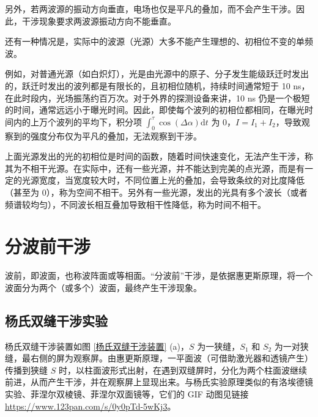 \documentclass[UTF8]{report}
\theoremstyle{MyLineTheoremStyle} %
\theoremstyle{MyBlockTheoremStyle} %
\theoremstyle{MySubsubsectionStyle} %
\begin{document}
另外，若两波源的振动方向垂直，电场也仅是平凡的叠加，而不会产生干涉。因此，干涉现象要求两波源振动方向不能垂直。

还有一种情况是，实际中的波源（光源）大多不能产生理想的、初相位不变的单频波。

例如，对普通光源（如白炽灯），光是由光源中的原子、分子发生能级跃迁时发出的，跃迁时发出的波列都是有限长的，且初相位随机，持续时间通常短于 10 ns，在此时段内，光场振荡约百万次。对于外界的探测设备来讲，10 ns 仍是一个极短的时间，通常远远小于曝光时间。因此，即使每个波列的初相位都相同，在曝光时间内的上万个波列的平均下，积分项 $\int_{0}^{\tau}  \cos(\Delta \alpha) \mathrm{d} t$ 为 0，$I = I_1 + I_2$，导致观察到的强度分布仅为平凡的叠加，无法观察到干涉。

上面光源发出的光的初相位是时间的函数，随着时间快速变化，无法产生干涉，称其为不相干光源。在实际中，还有一些光源，并不能达到完美的点光源，而是有一定的光源宽度，当宽度较大时，不同位置上光的叠加，会导致条纹的对比度降低（甚至为 0），称为空间不相干。另外有一些光源，发出的光具有多个波长（或者频谱较均匀），不同波长相互叠加导致相干性降低，称为时间不相干。




\section{分波前干涉}

波前，即波面，也称波阵面或等相面。“分波前”干涉，是依据惠更斯原理，将一个波面分为两个（或多个）波面，最终产生干涉现象。

\subsection{杨氏双缝干涉实验}

杨氏双缝干涉装置如图 \ref{杨氏双缝干涉装置} (a)，$S$ 为一狭缝，$S_1$ 和 $S_2$ 为一对狭缝，最右侧的屏为观察屏。由惠更斯原理，一平面波（可借助激光器和透镜产生）传播到狭缝 $S$ 时，以柱面波形式出射，在遇到双缝屏时，分化为两个柱面波继续前进，从而产生干涉，并在观察屏上显现出来。与杨氏实验原理类似的有洛埃德镜实验、菲涅尔双棱镜、菲涅尔双面镜等，它们的 GIF 动图见链接 \href{https://www.123pan.com/s/0y0pTd-5wKj3}{https://www.123pan.com/s/0y0pTd-5wKj3}。
\end{document}
